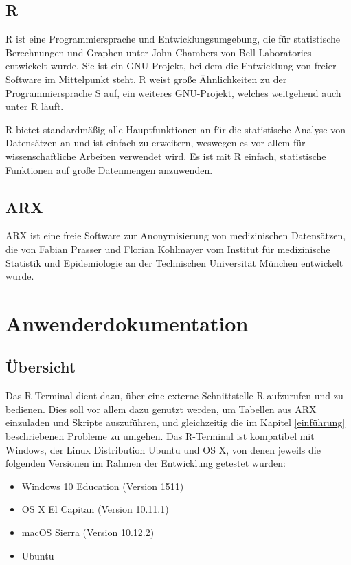 \documentclass[a4paper, 12pt]{report} %
\begin{document}

\section*{R}\label{r}
R ist eine Programmiersprache und Entwicklungsumgebung, die für statistische Berechnungen und Graphen unter John Chambers von Bell Laboratories entwickelt wurde. Sie ist ein GNU-Projekt, bei dem die Entwicklung von freier Software im Mittelpunkt steht. R weist große Ähnlichkeiten zu der Programmiersprache S auf, ein weiteres GNU-Projekt, welches weitgehend auch unter R läuft. \cite{rproject}

R bietet standardmäßig alle Hauptfunktionen an für die statistische Analyse von Datensätzen an und ist einfach zu erweitern, weswegen es vor allem für wissenschaftliche Arbeiten verwendet wird. Es ist mit R einfach, statistische Funktionen auf große Datenmengen anzuwenden.  



\section*{ARX}
ARX ist eine freie Software zur Anonymisierung von medizinischen Datensätzen, die von Fabian Prasser und Florian Kohlmayer vom Institut für medizinische Statistik und Epidemiologie an der Technischen Universität München entwickelt wurde.



\chapter{Anwenderdokumentation}
\section{Übersicht}
Das R-Terminal dient dazu, über eine externe Schnittstelle R aufzurufen und zu bedienen. Dies soll vor allem dazu genutzt werden, um Tabellen aus ARX einzuladen und Skripte auszuführen, und gleichzeitig die im Kapitel \ref{einführung} beschriebenen Probleme zu umgehen. Das R-Terminal ist kompatibel mit Windows, der Linux Distribution Ubuntu und OS X, von denen jeweils die folgenden Versionen im Rahmen der Entwicklung getestet wurden: 

\begin{itemize}
\item Windows 10 Education (Version 1511)
\item OS X El Capitan (Version 10.11.1)
\item macOS Sierra (Version 10.12.2)
\item Ubuntu
\end{itemize}
\end{document}
